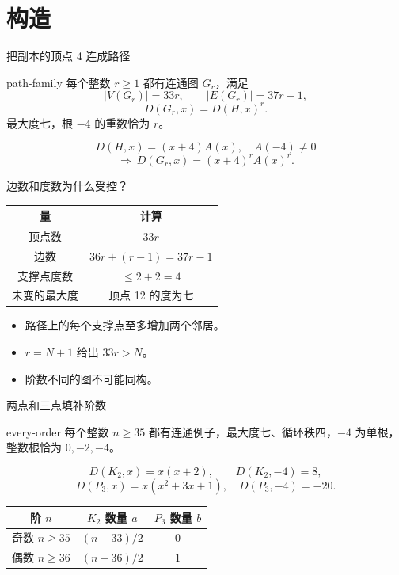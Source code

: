 \documentclass{beamer}
\begin{document}
\section{构造}
\begin{frame}{把副本的顶点 4 连成路径}
\begin{bookresult}{path-family}
每个整数 $r\geq1$ 都有连通图 $G_r$，满足
\[|V(G_r)|=33r,\qquad |E(G_r)|=37r-1,\]
\[D(G_r,x)=D(H,x)^r.\]
最大度七，根 $-4$ 的重数恰为 $r$。
\end{bookresult}
\[D(H,x)=(x+4)A(x),\quad A(-4)\ne0\]
\[\Longrightarrow\ D(G_r,x)=(x+4)^rA(x)^r.\]
\end{frame}
\begin{frame}{边数和度数为什么受控？}
\begin{center}\begin{tabular}{c|c}
量 & 计算\\\hline
顶点数 & $33r$\\
边数 & $36r+(r-1)=37r-1$\\
支撑点度数 & $\leq2+2=4$\\
未变的最大度 & 顶点 12 的度为七
\end{tabular}\end{center}
\begin{itemize}
\item 路径上的每个支撑点至多增加两个邻居。
\item $r=N+1$ 给出 $33r>N$。
\item 阶数不同的图不可能同构。
\end{itemize}
\end{frame}
\begin{frame}{两点和三点填补阶数}
\begin{bookresult}{every-order}
每个整数 $n\geq35$ 都有连通例子，最大度七、循环秩四，$-4$ 为单根，整数根恰为 $0,-2,-4$。
\end{bookresult}
\[D(K_2,x)=x(x+2),\qquad D(K_2,-4)=8,\]
\[D(P_3,x)=x(x^2+3x+1),\quad D(P_3,-4)=-20.\]
\begin{center}\begin{tabular}{c|cc}
阶 $n$ & $K_2$ 数量 $a$ & $P_3$ 数量 $b$\\\hline
奇数 $n\geq35$ & $(n-33)/2$ & $0$\\
偶数 $n\geq36$ & $(n-36)/2$ & $1$
\end{tabular}\end{center}
\end{frame}
\end{document}
